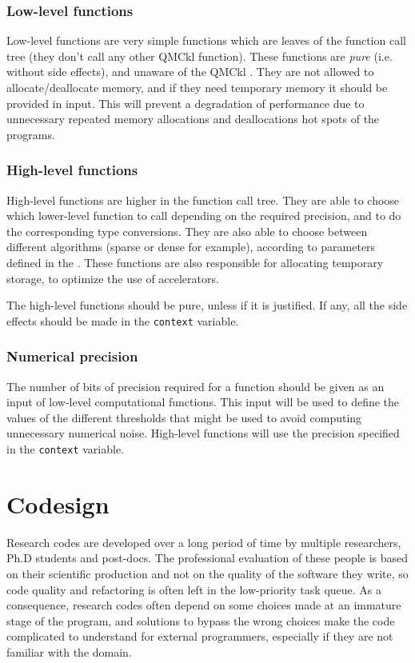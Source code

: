 \subsubsection{Low-level functions}

Low-level functions are very simple functions which are leaves of
the function call tree (they don't call any other \ac{QMCkl} function).
These  functions   are   \emph{pure} (i.e. without side effects), and
unaware of the \ac{QMCkl} {\context}. They are not allowed to
allocate/deallocate memory, and if they need temporary memory it
should be provided in input. This will prevent a degradation of
performance due to unnecessary repeated memory allocations and
deallocations hot spots of the programs.


\subsubsection{High-level functions}

High-level functions  are higher in the function  call tree.
They  are  able  to  choose which  lower-level  function  to  call
depending on the required precision, and to do the corresponding type
conversions. They are also able to choose between different algorithms
(sparse or dense for example), according to parameters defined in the
{\context}.  These functions are also responsible for allocating
temporary storage, to optimize the use of accelerators.

The high-level functions should be pure, unless if it is
justified. If any, all the side effects should be made in the
\texttt{context} variable.

\subsubsection{Numerical precision}

The number of bits of precision  required for a function should be
given as an input of low-level computational functions. This input
will be used to define the values of the different thresholds that
might be used to avoid computing unnecessary numerical
noise. High-level functions will use the precision specified in the
\texttt{context} variable.


\section{Codesign}
\label{sec:codesign}

Research codes are developed over a long period of time by multiple
researchers, Ph.D students and post-docs. The professional evaluation
of these people is based on their scientific production and not on the
quality of the software they write, so code quality and refactoring is
often left in the low-priority task queue. As a consequence, research
codes often depend on some choices made at an immature stage of the
program, and solutions to bypass the wrong choices make the code
complicated to understand for external programmers, especially if they
are not familiar with the domain.

